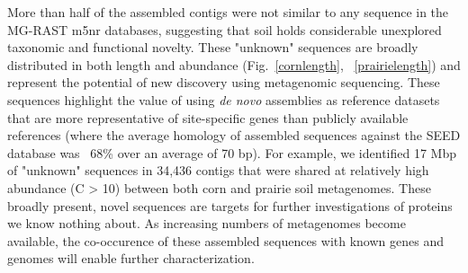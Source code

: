\documentclass{pnastwo}
\begin{document}
\begin{article}
More than half of the assembled contigs were not similar to any sequence
in the MG-RAST m5nr databases, suggesting that soil holds considerable unexplored taxonomic
and functional novelty. These "unknown" sequences are
broadly distributed in both length and abundance (Fig.~\ref{cornlength}, ~\ref{prairielength}) and
represent the potential of new discovery using metagenomic sequencing. 
These sequences highlight the value of using {\em de novo}
assemblies as reference datasets that are more representative of site-specific
genes than publicly available references (where the average homology of assembled
sequences against the SEED database was ~68\% over an average of 70 bp).  For example, we
identified 17 Mbp of "unknown" sequences in 34,436 contigs that were shared at relatively high abundance (C > 10) between both corn and prairie soil metagenomes.  These broadly present, novel sequences are targets for further
investigations of proteins we know nothing about. As increasing numbers of metagenomes become available, the co-occurence of these assembled sequences with known genes and genomes will enable further characterization.


\end{article}
\end{document}
